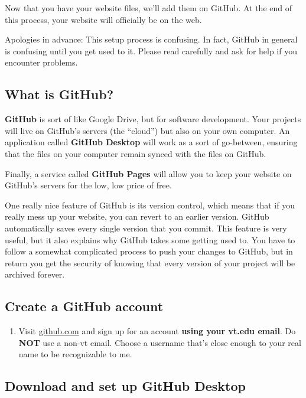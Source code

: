 \documentclass[]{book}
\providecommand{\tightlist}{%
  \setlength{\itemsep}{0pt}\setlength{\parskip}{0pt}}
\theoremstyle{definition}
\theoremstyle{definition}
\theoremstyle{definition}
\theoremstyle{remark}
\begin{document}
Now that you have your website files, we'll add them on GitHub. At the
end of this process, your website will officially be on the web.

Apologies in advance: This setup process is confusing. In fact, GitHub
in general is confusing until you get used to it. Please read carefully
and ask for help if you encounter problems.

\hypertarget{what-is-github}{%
\subsection{What is GitHub?}\label{what-is-github}}

\textbf{GitHub} is sort of like Google Drive, but for software
development. Your projects will live on GitHub's servers (the ``cloud'')
but also on your own computer. An application called \textbf{GitHub
Desktop} will work as a sort of go-between, ensuring that the files on
your computer remain synced with the files on GitHub.

Finally, a service called \textbf{GitHub Pages} will allow you to keep
your website on GitHub's servers for the low, low price of free.

One really nice feature of GitHub is its version control, which means
that if you really mess up your website, you can revert to an earlier
version. GitHub automatically saves every single version that you
commit. This feature is very useful, but it also explains why GitHub
takes some getting used to. You have to follow a somewhat complicated
process to push your changes to GitHub, but in return you get the
security of knowing that every version of your project will be archived
forever.

\hypertarget{create-a-github-account}{%
\subsection{Create a GitHub account}\label{create-a-github-account}}

\begin{enumerate}
\def\labelenumi{\arabic{enumi}.}
\tightlist
\item
  Visit \href{https://github.com}{github.com} and sign up for an account
  \textbf{using your vt.edu email}. Do \textbf{NOT} use a non-vt email.
  Choose a username that's close enough to your real name to be
  recognizable to me.
\end{enumerate}

\hypertarget{download-and-set-up-github-desktop}{%
\subsection{Download and set up GitHub
Desktop}\label{download-and-set-up-github-desktop}}
\end{document}
